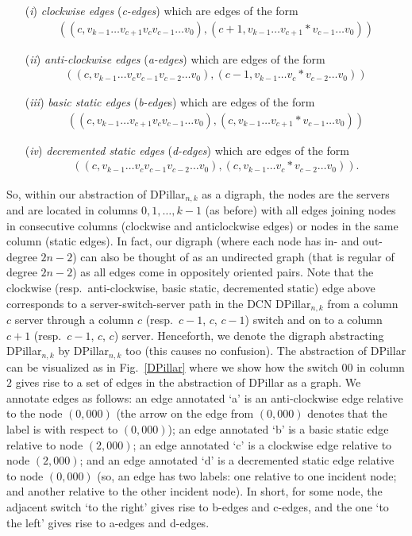 \documentclass{article}
\begin{document}
\begin{itemize}
\item[(\emph{i\/})] \emph{clockwise edges\/} (\emph{c-edges\/}) which are edges of the form 
  \begin{align*}
    ((c,v_{k-1}\ldots v_{c+1}v_c v_{c-1}\ldots v_0),
    (c+1,v_{k-1}\ldots v_{c+1}*v_{c-1}\ldots v_0))
  \end{align*}
\item[(\emph{ii\/})] \emph{anti-clockwise edges\/} (\emph{a-edges\/}) which are edges of the form 
  \begin{align*}
    ((c,v_{k-1}\ldots v_{c}v_{c-1} v_{c-2}\ldots v_0),   (c-1,v_{k-1}\ldots v_{c}*v_{c-2}\ldots v_0))
  \end{align*}
\item[(\emph{iii\/})] \emph{basic static edges\/} (\emph{b-edge\/}s) which are edges of the form 
  \begin{align*}
    ((c,v_{k-1}\ldots v_{c+1}v_{c} v_{c-1}\ldots v_0),   (c,v_{k-1}\ldots v_{c+1}*v_{c-1}\ldots v_0))
  \end{align*}
\item [(\emph{iv\/})] \emph{decremented static edges\/} (\emph{d-edges\/}) which are edges of the form
  \begin{align*}
    ((c,v_{k-1}\ldots v_{c}v_{c-1}v_{c-2}\ldots v_0),   (c,v_{k-1}\ldots v_{c}*v_{c-2}\ldots v_0)).
  \end{align*}
\end{itemize}
So, within our abstraction of DPillar$_{n,k}$ as a digraph, the nodes are the
servers and are located in columns $0,1,\ldots,k-1$ (as before) with all edges
joining nodes in consecutive columns (clockwise and anticlockwise edges) or
nodes in the same column (static edges). In fact, our digraph (where each node
has in- and out-degree $2n-2$) can also be thought of as an undirected graph
(that is regular of degree $2n-2$) as all edges come in oppositely oriented
pairs. Note that the clockwise (resp.\ anti-clockwise, basic static, decremented
static) edge above corresponds to a server-switch-server path in the DCN
DPillar$_{n,k}$ from a column $c$ server through a column $c$ (resp.\ $c-1$, $c$,
$c-1$) switch and on to a column $c+1$ (resp.\ $c-1$, $c$, $c$) server.
Henceforth, we denote the digraph abstracting DPillar$_{n,k}$ by DPillar$_{n,k}$
too (this causes no confusion). The abstraction of DPillar can be visualized as
in Fig.~\ref{DPillar} where we show how the switch $00$ in column $2$ gives rise
to a set of edges in the abstraction of DPillar as a graph. We annotate edges as
follows: an edge annotated `a' is an anti-clockwise edge relative to the node
$(0,000)$ (the arrow on the edge from $(0,000)$ denotes that the label is with
respect to $(0,000)$); an edge annotated `b' is a basic static edge relative to
node $(2,000)$; an edge annotated `c' is a clockwise edge relative to node
$(2,000)$; and an edge annotated `d' is a decremented static edge relative to
node $(0,000)$ (so, an edge has two labels: one relative to one incident node;
and another relative to the other incident node). In short, for some node, the
adjacent switch `to the right' gives rise to b-edges and c-edges, and the one
`to the left' gives rise to a-edges and d-edges.
\end{document}
